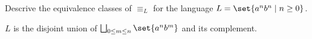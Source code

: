 \begin{exercise}
    Descrive the equivalence classes of $\equiv_L$ for the language
    $L = \set{a^nb^n \mid n \ge 0}$.
\end{exercise}
\begin{solution}
    $L$ is the disjoint union of $\bigsqcup_{0 \le m \le n} \set{a^nb^m}$
    and its complement.
\end{solution}
%
%

